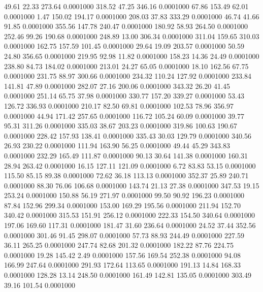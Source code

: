   49.61   22.33  273.64   0.0001000
 318.52   47.25  346.16   0.0001000
  67.86  153.49   62.01   0.0001000
   1.47  150.02  194.17   0.0001000
 208.03   37.83  333.29   0.0001000
  46.74   41.66   91.85   0.0001000
 355.56  147.78  240.47   0.0001000
 180.92   58.93  264.50   0.0001000
 252.46   99.26  190.68   0.0001000
 248.89   13.00  306.34   0.0001000
 311.04  159.65  310.03   0.0001000
 162.75  157.59  101.45   0.0001000
  29.64   19.09  203.57   0.0001000
  50.59   24.80  356.65   0.0001000
 219.95   92.98   11.82   0.0001000
 158.23   14.36   24.49   0.0001000
 238.80   84.73  184.02   0.0001000
 213.01   24.27   65.05   0.0001000
  18.10  162.56   67.75   0.0001000
 231.75   88.97  300.66   0.0001000
 234.32  110.24  127.92   0.0001000
 233.84  141.81   47.89   0.0001000
 282.07   27.16  200.06   0.0001000
 343.32   26.20   41.45   0.0001000
 251.14   65.75   37.98   0.0001000
 330.77  157.20  339.27   0.0001000
  53.43  126.72  336.93   0.0001000
 210.17   82.50   69.81   0.0001000
 102.53   78.96  356.97   0.0001000
  44.94  171.42  257.65   0.0001000
 116.72  105.24   60.09   0.0001000
  39.77   95.31  311.26   0.0001000
 335.03   38.67  203.23   0.0001000
 319.86  100.63  190.67   0.0001000
 228.42  157.93  138.41   0.0001000
 335.43   30.03  129.79   0.0001000
 340.56   26.93  230.22   0.0001000
 111.94  163.90   56.25   0.0001000
  49.44   45.29  343.83   0.0001000
 232.29  165.49  111.87   0.0001000
  90.13   30.64  141.38   0.0001000
 160.31   28.94  263.42   0.0001000
  16.15  127.11  121.09   0.0001000
   6.72   83.83   53.15   0.0001000
 115.50   85.15   89.38   0.0001000
  72.62   36.18  113.13   0.0001000
 352.37   25.89  240.71   0.0001000
  88.30   76.06  106.68   0.0001000
 143.74   21.13   27.38   0.0001000
 347.53   19.15  253.24   0.0001000
 150.88   56.19  271.97   0.0001000
  99.50   90.92  196.23   0.0001000
  87.84  152.96  299.34   0.0001000
 153.00  169.29  195.56   0.0001000
 211.94  152.70  340.42   0.0001000
 315.53  151.91  256.12   0.0001000
 222.33  154.50  340.64   0.0001000
 197.06  169.60  117.31   0.0001000
 181.47   31.60  236.64   0.0001000
  24.52   37.44  352.56   0.0001000
 301.46   91.45  298.07   0.0001000
  57.73   88.93  244.49   0.0001000
 227.59   36.11  265.25   0.0001000
 247.74   82.68  201.32   0.0001000
 182.22   87.76  224.75   0.0001000
  19.28  145.42    2.49   0.0001000
 157.56  169.54  252.38   0.0001000
  94.08  166.99  247.64   0.0001000
 291.93  172.64  113.65   0.0001000
 191.13   14.84  168.33   0.0001000
 128.28   13.14  248.50   0.0001000
 161.49  142.81  135.05   0.0001000
 303.49   39.16  101.54   0.0001000
